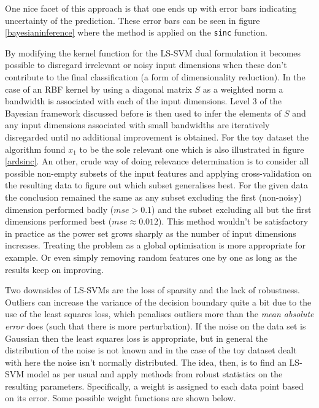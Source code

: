 One nice facet of this approach is that one ends up with error bars indicating uncertainty of the prediction. These error bars can be seen in figure \ref{bayesianinference} where the method is applied on the \texttt{sinc} function.


By modifying the kernel function for the LS-SVM dual formulation it becomes possible to disregard irrelevant or noisy input dimensions when these don't contribute to the final classification (a form of dimensionality reduction). In the case of an RBF kernel by using a diagonal matrix $S$ as a weighted norm a bandwidth is associated with each of the input dimensions. Level 3 of the Bayesian framework discussed before is then used to infer the elements of $S$ and any input dimensions associated with small bandwidths are iteratively disregarded until no additional improvement is obtained. For the toy dataset the algorithm found $x_1$ to be the sole relevant one which is also illustrated in figure \ref{ardsinc}. An other, crude way of doing relevance determination is to consider all possible non-empty subsets of the input features and applying cross-validation on the resulting data to figure out which subset generalises best. For the given data the conclusion remained the same as any subset excluding the first (non-noisy) dimension performed badly ($mse>0.1$) and the subset excluding all but the first dimensions performed best ($mse\approx 0.012$). This method wouldn't be satisfactory in practice as the power set grows sharply as the number of input dimensions increases. Treating the problem as a global optimisation is more appropriate for example. Or even simply removing random features one by one as long as the results keep on improving.


Two downsides of LS-SVMs are the loss of sparsity and the lack of robustness. Outliers can increase the variance of the decision boundary quite a bit due to the use of the least squares loss, which penalises outliers more than the \textit{mean absolute error} does (such that there is more perturbation). If the noise on the data set is Gaussian then the least squares loss is appropriate, but in general the distribution of the noise is not known and in the case of the toy dataset dealt with here the noise isn't normally distributed. The idea, then, is to find an LS-SVM model as per usual and apply methods from robust statistics on the resulting parameters. Specifically, a weight is assigned to each data point based on its error. Some possible weight functions are shown below. 

